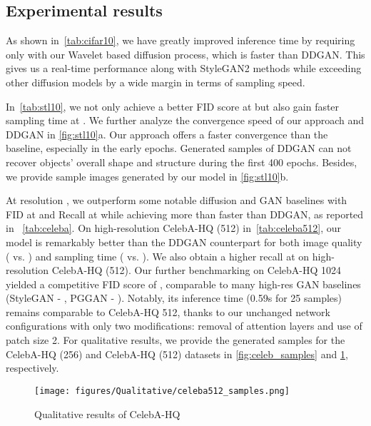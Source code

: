 \documentclass[10pt,twocolumn,letterpaper]{article}
\newcommand{\minisection}[1]{\vspace{2mm}\noindent{\textbf{#1}}}
\begin{document}
\subsection{Experimental results} 

\minisection{CIFAR-10}
As shown in~\cref{tab:cifar10}, we have greatly improved inference time by requiring only  with our Wavelet based diffusion process, which is  faster than DDGAN. This gives us a real-time performance along with StyleGAN2 methods while exceeding other diffusion models by a wide margin in terms of sampling speed. 



\minisection{STL-10}
In~\cref{tab:stl10}, we not only achieve a better FID score at  but also gain faster sampling time at . We further analyze the convergence speed of our approach and DDGAN in \cref{fig:stl10}a. Our approach offers a faster convergence than the baseline, especially in the early epochs. Generated samples of DDGAN can not recover objects' overall shape and structure during the first 400 epochs. Besides, we provide sample images generated by our model in \cref{fig:stl10}b.

\minisection{CelebA-HQ}
At resolution , we outperform some notable diffusion and GAN baselines with FID at  and Recall at  while achieving more than  faster than DDGAN, as reported in ~\cref{tab:celeba}. On high-resolution CelebA-HQ (512) in~\cref{tab:celeba512}, our model is remarkably better than the DDGAN counterpart for both image quality ( vs. ) and sampling time ( vs. ). We also obtain a higher recall at  on high-resolution CelebA-HQ (512). Our further benchmarking on CelebA-HQ 1024 yielded a competitive FID score of , comparable to many high-res GAN baselines (StyleGAN - , PGGAN - ). Notably, its inference time (0.59s for 25 samples) remains comparable to CelebA-HQ 512, thanks to our unchanged network configurations with only two modifications: removal of attention layers and use of patch size 2. For qualitative results, we provide the generated samples for the CelebA-HQ (256) and CelebA-HQ (512) datasets in \cref{fig:celeb_samples} and \cref{fig:celeb_samples_512}, respectively. 



\begin{figure}[t]
  \centering
\texttt{[image: figures/Qualitative/celeba512\_samples.png]}
    \vspace{-3mm}
   \caption{Qualitative results of CelebA-HQ }
   \label{fig:celeb_samples_512}
    \vspace{-1mm}
\end{figure}
\end{document}

